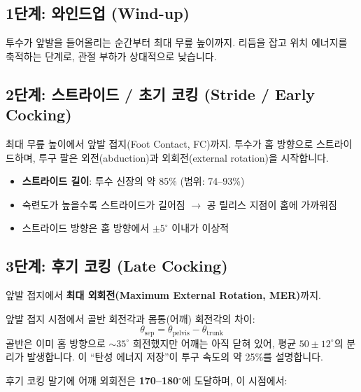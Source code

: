 \documentclass[11pt, a4paper]{report}
\begin{document}
\subsection{1단계: 와인드업 (Wind-up)}

투수가 앞발을 들어올리는 순간부터 최대 무릎 높이까지. 리듬을 잡고 위치 에너지를 축적하는 단계로, 관절 부하가 상대적으로 낮습니다.

\subsection{2단계: 스트라이드 / 초기 코킹 (Stride / Early Cocking)}

최대 무릎 높이에서 앞발 접지(Foot Contact, FC)까지. 투수가 홈 방향으로 스트라이드하며, 투구 팔은 외전(abduction)과 외회전(external rotation)을 시작합니다.

\begin{biomechbox}[title={핵심 파라미터: 스트라이드}]
\begin{itemize}[leftmargin=*]
  \item \textbf{스트라이드 길이}: 투수 신장의 약 85\% (범위: 74--93\%)
  \item 숙련도가 높을수록 스트라이드가 길어짐 $\rightarrow$ 공 릴리스 지점이 홈에 가까워짐
  \item 스트라이드 방향은 홈 방향에서 $\pm 5^\circ$ 이내가 이상적
\end{itemize}
\end{biomechbox}

\subsection{3단계: 후기 코킹 (Late Cocking)}

앞발 접지에서 \textbf{최대 외회전(Maximum External Rotation, MER)}까지.

\begin{definition}
앞발 접지 시점에서 골반 회전각과 몸통(어깨) 회전각의 차이:
\begin{equation}
\theta_{\text{sep}} = \theta_{\text{pelvis}} - \theta_{\text{trunk}}
\end{equation}
골반은 이미 홈 방향으로 $\sim 35^\circ$ 회전했지만 어깨는 아직 닫혀 있어, 평균 $50 \pm 12^\circ$의 분리가 발생합니다. 이 ``탄성 에너지 저장''이 투구 속도의 약 25\%를 설명합니다.
\end{definition}

후기 코킹 말기에 어깨 외회전은 \textbf{170--180$^\circ$}에 도달하며, 이 시점에서:
\end{document}
